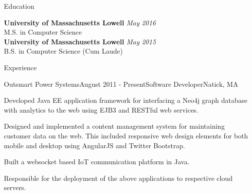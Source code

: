 \documentclass{resume} %
\begin{document}

\begin{rSection}{Education}

{\bf University of Massachusetts Lowell} \hfill {\em May 2016} \\ 
M.S. in Computer Science  \smallskip \\
{\bf University of Massachusetts Lowell} \hfill {\em May 2015} \\ 
B.S. in Computer Science (Cum Laude)  \smallskip \\

\end{rSection}


\begin{rSection}{Experience}


\begin{rSubsection}{Outsmart Power Systems}{August 2011 - Present}{Software Developer}{Natick, MA}
\item Developed Java EE application framework for interfacing a Neo4j graph database with analytics to the web using EJB3 and RESTful web services.
\item Designed and implemented a content management system for maintaining customer data on the web. This included responsive web design elements for both mobile and desktop using AngularJS and Twitter Bootstrap.
\item Built a websocket based IoT communication platform in Java.
\item Responsible for the deployment of the above applications to respective cloud servers.
\end{rSubsection}



\end{rSection}
\end{document}
